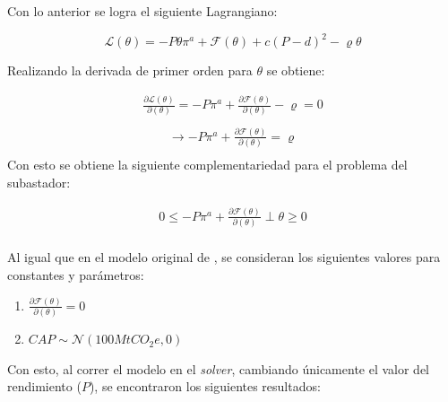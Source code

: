 Con lo anterior se logra el siguiente Lagrangiano:

$$\mathcal{L}(\theta)=-P\theta\pi^a+\mathcal{F}(\theta)+c(P-d)^2 - \varrho\theta $$

Realizando la derivada de primer orden para $\theta$ se obtiene:

\begin{equation}
\begin{array}{rrclcl}
    \frac{\partial\mathcal{L}(\theta)}{\partial (\theta)}=-P\pi^a+\frac{\partial\mathcal{F}(\theta)}{\partial(\theta)}-\varrho=0 \label{lag1}\\
\end{array}
\end{equation}
\begin{equation}
\begin{array}{rrclcl}
    \rightarrow -P\pi^a+\frac{\partial\mathcal{F}(\theta)}{\partial(\theta)}=\varrho \label{lag11}\\
\end{array}
\end{equation}
Con esto se obtiene la siguiente complementariedad para el problema del subastador:

\begin{equation}
\begin{array}{rrclcl}
    0\leq -P\pi^a+\frac{\partial\mathcal{F}(\theta)}{\partial(\theta)}\perp \theta \geq 0 \label{compllag1}\\
\end{array}
\end{equation}

Al igual que en el modelo original de , se consideran los siguientes valores para constantes y parámetros:
\begin{enumerate}
    \item $\frac{\partial\mathcal{F}(\theta)}{\partial(\theta)}=0$
    \item $CAP\sim \mathcal{N}(100MtCO_{2}e,0)$
\end{enumerate}

Con esto, al correr el modelo en el \textit{solver}, cambiando únicamente el valor del rendimiento ($P$), se encontraron los siguientes resultados:

